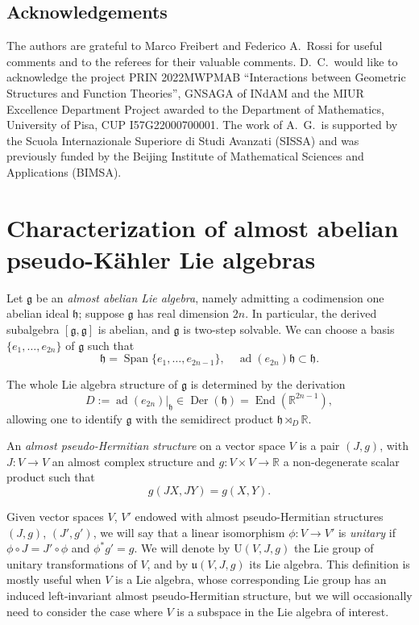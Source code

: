 \documentclass{article}
\theoremstyle{definition}
\DeclareMathOperator{\End}{End}
\DeclareMathOperator{\ad}{ad}
\DeclareMathOperator{\Der}{Der}
\newcommand{\R}{\mathbb{R}}
\newcommand{\frg}{\mathfrak{g}}
\newcommand{\frh}{\mathfrak{h}}
\newcommand{\Span}[1]{\operatorname{Span}\{#1\}}
\newcommand{\lie}[1]{\mathfrak{#1}}
\newcommand{\g}{\lie g}
\begin{document}
\subsection*{Acknowledgements}

The authors are grateful to Marco Freibert and Federico A.\ Rossi for useful comments and to the referees for their valuable comments. D.\ C.\ would like to acknowledge the project PRIN 2022MWPMAB ``Interactions between Geometric Structures and Function Theories'', GNSAGA of INdAM and  the MIUR Excellence Department Project awarded to the Department of Mathematics, University of Pisa, CUP I57G22000700001. The work of A.\ G.\ is supported by the Scuola Internazionale Superiore di Studi Avanzati (SISSA) and was previously funded by the Beijing Institute of Mathematical Sciences and Applications (BIMSA).


\section{Characterization of almost abelian pseudo-Kähler Lie algebras}\label{section:characterization}

Let $\g$ be an \emph{almost abelian Lie algebra}, namely admitting a codimension one abelian ideal $\frh$; suppose $\g$ has real dimension $2n$. In particular, the derived subalgebra $[\frg,\frg]$ is abelian, and $\frg$ is two-step solvable. We can choose a basis $\{e_1,\ldots,e_{2n}\}$ of $\frg$ such that \begin{equation}\label{eqn:amostabelianbasis}
    \frh=\Span{e_1,\ldots,e_{2n-1}},\quad\ad(e_{2n})\lie h\subset\lie h.
\end{equation}

The whole Lie algebra structure of $\frg$ is determined by the derivation $$D:=\ad(e_{2n})|_{\frh}\in\Der(\frh)=\End(\R^{2n-1}),$$ allowing one to identify $\frg$ with the semidirect product $\frh\rtimes_D\R$.\medskip

An \emph{almost pseudo-Hermitian structure} on a vector space $V$ is a pair $(J,g)$, with $J\colon V\to V$ an almost complex structure and $g\colon V\times V\to\R$ a non-degenerate scalar product such that $$g(JX,JY)=g(X,Y).$$

Given vector spaces $V$, $V'$ endowed with almost pseudo-Hermitian structures $(J,g)$, $(J',g')$, we will say that a linear isomorphism $\phi\colon V\to V'$ is \emph{unitary} if $\phi\circ J=J'\circ\phi$ and $\phi^*g'=g$. We will denote by $\mathrm{U}(V,J,g)$ the Lie group of unitary transformations of $V$, and by $\lie{u}(V,J,g)$ its Lie algebra. This definition is mostly useful when $V$ is a Lie algebra, whose corresponding Lie group has an induced left-invariant almost pseudo-Hermitian structure, but we will occasionally need to consider the case where $V$ is a subspace in the Lie algebra of interest.\medskip
\end{document}
